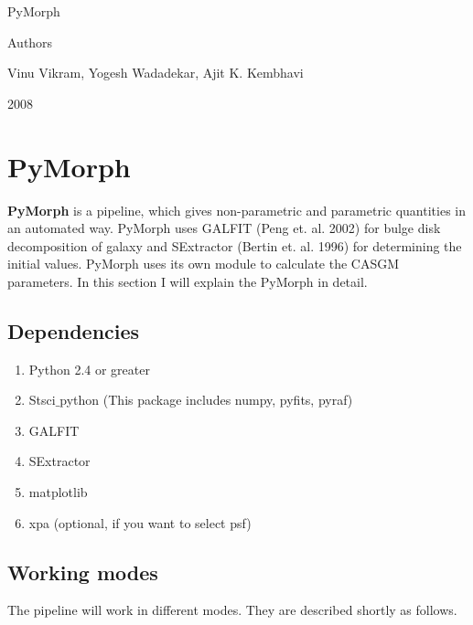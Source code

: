 \documentclass[a4paper,12pt]{article}
\begin{document}
\begin{titlepage}
\begin{center}

\begin{Huge}PyMorph\end{Huge}

\begin{large}
\end{large}
\vspace{5cm}
\begin{center}
Authors\end{center}
\vspace{0.5cm}
\begin{Large}Vinu Vikram, Yogesh Wadadekar, Ajit K. Kembhavi \end{Large}

\vspace{5cm}
2008
\end{center}
\end{titlepage}
\tableofcontents
\clearpage
\section{PyMorph}
{\bf PyMorph} is a pipeline, which gives non-parametric and parametric quantities in an automated way. PyMorph uses GALFIT (Peng et. al. 2002) for bulge disk decomposition of galaxy and SExtractor (Bertin et. al. 1996) for determining the initial values. PyMorph uses its own module to calculate the CASGM parameters. In this section I will explain the PyMorph in detail.
\subsection{Dependencies}
\begin{enumerate}
 \item Python 2.4 or greater
 \item Stsci$\_$python (This package includes numpy, pyfits, pyraf)
 \item GALFIT
 \item SExtractor
 \item matplotlib
 \item xpa (optional, if you want to select psf)
\end{enumerate}

\subsection{Working modes}
The pipeline will work in different modes. They are described shortly as follows.
\end{document}
